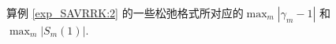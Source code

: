 		\vspace{-8mm}

		\begin{figure}[H]
			\begin{center}
			\caption{算例 \ref{exp_SAVRRK:2} 的一些松弛格式所对应的$\max_m\left|\gamma_m-1\right|$ 和 $\max_m\left|S_m(1)\right|$.}
			\label{fig_SAVRRK:2-1}
			\end{center}
			\end{figure}

